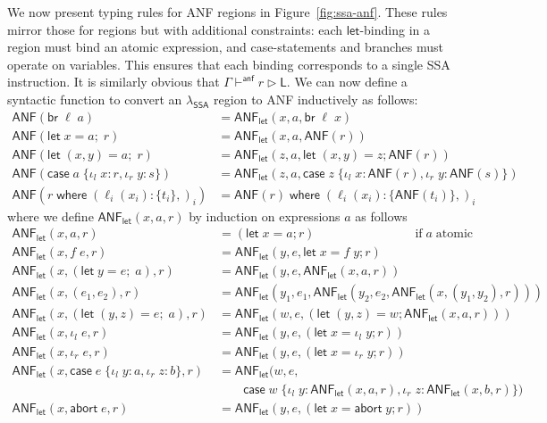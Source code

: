 \documentclass[acmsmall,screen,review]{acmart}
\newcommand{\ms}[1]{\ensuremath{\mathsf{#1}}}
\newcommand{\lto}{:}
\newcommand{\linl}[1]{\iota_l\;{#1}}
\newcommand{\linr}[1]{\iota_r\;{#1}}
\newcommand{\labort}[1]{\ms{abort}\;{#1}}
\newcommand{\letexpr}[3]{\ensuremath{\ms{let}\;#1 = #2;\;#3}}
\newcommand{\caseexpr}[5]{\ms{case}\;#1\;\{\linl{#2} \lto #3, \linr{#4} \lto #5\}}
\newcommand{\letstmt}[3]{\ensuremath{\ms{let}\;#1 = #2; #3}}
\newcommand{\brb}[2]{\ms{br}\;#1\;#2}
\newcommand{\casestmt}[5]{\ms{case}\;#1\;\{\linl{#2} \lto #3, \linr{#4} \lto #5\}}
\newcommand{\where}[2]{#1\;\ms{where}\;#2}
\newcommand{\wbranch}[3]{#1(#2) \lto \{#3\}}
\newcommand{\ahaslb}[3]{#1 \vdash^{\ms{anf}} #2 \rhd #3}
\newcommand{\toanf}[1]{\ms{ANF}(#1)}
\newcommand{\letanf}[3]{\ms{ANF}_{\ms{let}}(#1, #2, #3)}
\newcommand{\isotopessa}{\(\lambda_{\ms{SSA}}\)}
\begin{document}
We now present typing rules for ANF regions in Figure~\ref{fig:ssa-anf}. These rules mirror those
for regions but with additional constraints: each \ms{let}-binding in a region must bind an atomic
expression, and case-statements and branches must operate on variables. This ensures that each
binding corresponds to a single SSA instruction. It is similarly obvious that
$\ahaslb{\Gamma}{r}{\ms{L}}$. We can now define a syntactic function to convert an \isotopessa{}
region to ANF inductively as follows:
\begin{equation}
  \begin{aligned}
    \toanf{\brb{\ell}{a}} &= \letanf{x}{a}{\brb{\ell}{x}} \\
    \toanf{\letexpr{x}{a}{r}} &= \letanf{x}{a}{\toanf{r}} \\
    \toanf{\letexpr{(x, y)}{a}{r}} &= \letanf{z}{a}{\letstmt{(x, y)}{z}{\toanf{r}}} \\
    \toanf{\casestmt{a}{x}{r}{y}{s}} &= \letanf{z}{a}{\casestmt{z}{x}{\toanf{r}}{y}{\toanf{s}}} \\
    \toanf{\where{r}{(\wbranch{\ell_i}{x_i}{t_i},)_i}}
      &= \where{\toanf{r}}{(\wbranch{\ell_i}{x_i}{\toanf{t_i}},)_i}
  \end{aligned}
\end{equation}
where we define $\letanf{x}{a}{r}$ by induction on expressions $a$ as follows
\begin{equation}
  \begin{aligned}
    \letanf{x}{a}{r} &= (\letstmt{x}{a}{r}) \hspace{8em} \text{if}\;a\;\text{atomic} \\
    \letanf{x}{f\;e}{r} &= \letanf{y}{e}{\letstmt{x}{f\;y}{r}} \\
    \letanf{x}{(\letexpr{y}{e}{a})}{r} &= \letanf{y}{e}{\letanf{x}{a}{r}} \\
    \letanf{x}{(e_1, e_2)}{r} &= \letanf{y_1}{e_1}{\letanf{y_2}{e_2}{\letanf{x}{(y_1,y_2)}{r}}} \\
    \letanf{x}{(\letexpr{(y, z)}{e}{a})}{r} 
      &= \letanf{w}{e}{(\letstmt{(y, z)}{w}{\letanf{x}{a}{r}})} \\
    \letanf{x}{\linl{e}}{r} &= \letanf{y}{e}{(\letstmt{x}{\linl{y}}{r})} \\
    \letanf{x}{\linr{e}}{r} &= \letanf{y}{e}{(\letstmt{x}{\linr{y}}{r})} \\
    \letanf{x}{\caseexpr{e}{y}{a}{z}{b}}{r} &= 
      \letanf{w}{e}{\\ & \qquad \casestmt{w}{y}{\letanf{x}{a}{r}}{z}{\letanf{x}{b}{r}}} \\
    \letanf{x}{\labort{e}}{r} &= \letanf{y}{e}{(\letstmt{x}{\labort{y}}{r})}
  \end{aligned}
\end{equation}
\end{document}
